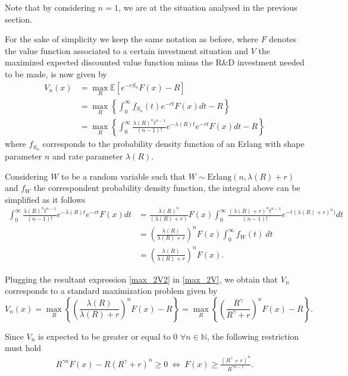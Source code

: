 Note that by considering $n=1$, we are at the situation analysed in the previous section.

For the sake of simplicity we keep the same notation as before, where $F$ denotes the value function associated to a certain investment situation and $V$ the maximized expected discounted value function minus the R\&D investment needed to be made, is now given by
\begin{align}
V_n(x)&=\max_R \mathds{E} [ e^{-rS_n}F(x)-R] \nonumber \\
&=\max_R  \left\{ \int_0 ^\infty f_{S_n}(t) e^{-rt} F(x) dt -R \right\} \nonumber \\
&=\max_R  \left\{ \int_0 ^\infty \frac{\lambda(R)^n t^{n-1}}{(n-1)!} e^{-\lambda(R)t} e^{-rt} F(x) dt -R \right\}
\label{max_2V}
\end{align}
where $f_{S_n}$ corresponds to the probability density function of an Erlang with shape parameter $n$ and rate parameter $\lambda(R)$.

Considering $W$ to be a random variable such that $W \sim \text{Erlang}(n, \lambda(R)+r)$ and $f_W$ the correspondent probability density function, the integral above can be simplified as it follows
\begin{align}
\int_0 ^\infty \frac{\lambda(R)^n t^{n-1}}{(n-1)!} e^{-\lambda(R)t} e^{-rt} F(x) dt &=
\frac{\lambda(R)^n}{(\lambda(R)+r)} F(x) \int_0 ^\infty \frac{(\lambda(R)+r)^n t^{n-1}}{(n-1)!} e^{-t(\lambda(R)+r)^n)} dt \nonumber \\
&=\left( \frac{\lambda(R)}{\lambda(R)+r}\right)^n F(x)  \int_0 ^\infty f_W(t) \ dt \nonumber \\
&=\left( \frac{\lambda(R)}{\lambda(R)+r}\right)^n F(x). \label{max_2V2}
\end{align}

Plugging the resultant expression \eqref{max_2V2} in \eqref{max_2V}, we obtain that $V_n$ corresponds to a standard maximization problem given by
\begin{equation}
V_n(x)=\max_R \left\{ \left( \frac{\lambda(R)}{\lambda(R)+r}\right)^n F(x)-R \right\}=\max_R \left\{ \left( \frac{R^\gamma}{R^\gamma+r}\right)^n F(x)-R \right\}.
	\label{max_2V3}
\end{equation}

Since $V_n$ is expected to be greater or equal to 0 $\forall n \in \mathds{N}$, the following restriction must hold
\begin{align}
R^{\gamma n} F(x)-R(R^\gamma + r)^n \geq 0 \  \Leftrightarrow \ F(x) \geq \frac{(R^\gamma+r)^n}{R^{\gamma n -1}}.
\label{max_2rest}
\end{align}



